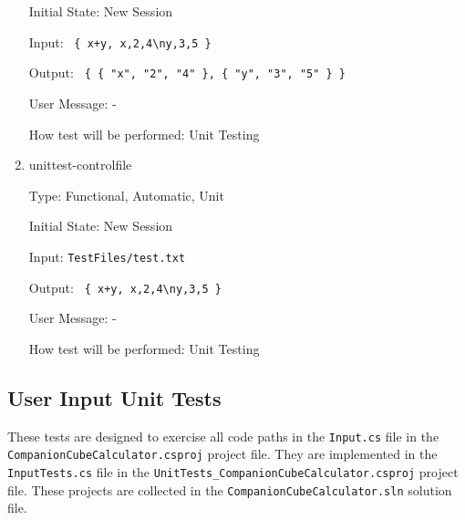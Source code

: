 \documentclass[12pt, titlepage]{article}
\begin{document}
\begin{enumerate}
	Initial State: New Session
	
	Input: \texttt{ \{ x+y, x,2,4\textbackslash ny,3,5 \} }
	
	Output: \texttt{ \{ \{ "x", "2", "4" \}, \{ "y", "3", "5" \} \}}
	
	User Message: -
	
	How test will be performed: Unit Testing\\
	
	\item{unittest-controlfile}
	
	Type: Functional, Automatic, Unit
	
	Initial State: New Session
	
	Input: \texttt{TestFiles/test.txt}
	
	Output: \texttt{ \{ x+y, x,2,4\textbackslash ny,3,5 \} }
	
	User Message: -
	
	How test will be performed: Unit Testing\\
	
\end{enumerate}

\subsection{User Input Unit Tests}
These tests are designed to exercise all code paths in the \texttt{Input.cs} 
file in the \texttt{CompanionCubeCalculator.csproj} project file. They are 
implemented in the \texttt{InputTests.cs} file in the 
\texttt{UnitTests\_CompanionCubeCalculator.csproj} project file. These projects 
are collected in the \texttt{CompanionCubeCalculator.sln} solution file.
\end{document}
